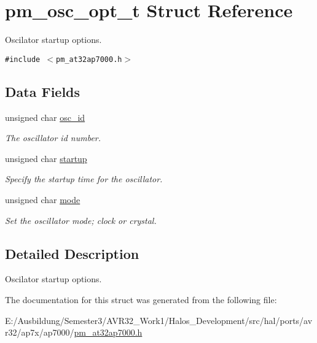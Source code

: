 \hypertarget{structpm__osc__opt__t}{
\section{pm\_\-osc\_\-opt\_\-t Struct Reference}
\label{structpm__osc__opt__t}
}
Oscilator startup options.  


{\tt \#include $<$pm\_\-at32ap7000.h$>$}

\subsection*{Data Fields}
\begin{CompactItemize}
\item 
\hypertarget{structpm__osc__opt__t_6735acf7c5cc5b9be3ce0eae78ee801b}{
unsigned char \hyperlink{structpm__osc__opt__t_6735acf7c5cc5b9be3ce0eae78ee801b}{osc\_\-id}}
\label{structpm__osc__opt__t_6735acf7c5cc5b9be3ce0eae78ee801b}

\begin{CompactList}\small\item\em The oscillator id number. \item\end{CompactList}\item 
\hypertarget{structpm__osc__opt__t_930ca8edc47fa42376295a42c3c518c6}{
unsigned char \hyperlink{structpm__osc__opt__t_930ca8edc47fa42376295a42c3c518c6}{startup}}
\label{structpm__osc__opt__t_930ca8edc47fa42376295a42c3c518c6}

\begin{CompactList}\small\item\em Specify the startup time for the oscillator. \item\end{CompactList}\item 
\hypertarget{structpm__osc__opt__t_30e7a4b78333d99dcb775c4112807679}{
unsigned char \hyperlink{structpm__osc__opt__t_30e7a4b78333d99dcb775c4112807679}{mode}}
\label{structpm__osc__opt__t_30e7a4b78333d99dcb775c4112807679}

\begin{CompactList}\small\item\em Set the oscillator mode; clock or crystal. \item\end{CompactList}\end{CompactItemize}


\subsection{Detailed Description}
Oscilator startup options. 

The documentation for this struct was generated from the following file:\begin{CompactItemize}
\item 
E:/Ausbildung/Semester3/AVR32\_\-Work1/Halos\_\-Development/src/hal/ports/avr32/ap7x/ap7000/\hyperlink{pm__at32ap7000_8h}{pm\_\-at32ap7000.h}\end{CompactItemize}
